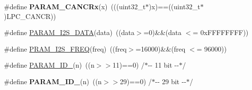 \begin{DoxyCompactItemize}
\item 
\hypertarget{group___c_a_n___private___macros_ga2950a0c8ef50d5bc25fddc2db474aad6}{\#define {\bfseries \-P\-A\-R\-A\-M\-\_\-\-C\-A\-N\-C\-Rx}(x)~(((uint32\-\_\-t$\ast$)x)==((uint32\-\_\-t$\ast$)\-L\-P\-C\-\_\-\-C\-A\-N\-C\-R))}\label{group___c_a_n___private___macros_ga2950a0c8ef50d5bc25fddc2db474aad6}

\item 
\#define \hyperlink{group___c_a_n___private___macros_ga3acb815ce774f3bd02974659596f4cd3}{\-P\-A\-R\-A\-M\-\_\-\-I2\-S\-\_\-\-D\-A\-T\-A}(data)~((data$>$=0)\&\&(data $<$= 0x\-F\-F\-F\-F\-F\-F\-F\-F))
\item 
\#define \hyperlink{group___c_a_n___private___macros_gae611bb4fb87a75b8a6127ce4c71472ab}{\-P\-R\-A\-M\-\_\-\-I2\-S\-\_\-\-F\-R\-E\-Q}(freq)~((freq$>$=16000)\&\&(freq $<$= 96000))
\item 
\#define \hyperlink{group___c_a_n___private___macros_gad8de9466b963ed20a02df5c2a314b2b0}{\-P\-A\-R\-A\-M\-\_\-\-I\-D\-\_}(n)~((n$>$$>$11)==0) /$\ast$-\/-\/ 11 bit -\/-\/$\ast$/
\item 
\hypertarget{group___c_a_n___private___macros_ga5a603c405a55c429310fd83b0ac7cd82}{\#define {\bfseries \-P\-A\-R\-A\-M\-\_\-\-I\-D\-\_}(n)~((n$>$$>$29)==0) /$\ast$-\/-\/ 29 bit -\/-\/$\ast$/}\label{group___c_a_n___private___macros_ga5a603c405a55c429310fd83b0ac7cd82}


\end{DoxyCompactItemize}
